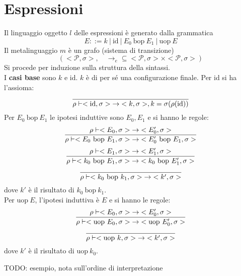 \documentclass[a4paper]{report}
\newcommand{\prop}{\mathcal{P}}
\newcommand{\bop}{\ \mathrm{bop}\ }
\newcommand{\uop}{\mathrm{uop}\ }
\theoremstyle{definition} \newtheorem*{defi}{Def}
\theoremstyle{plain} \newtheorem{lemma}{Lemma}
\theoremstyle{plain} \newtheorem{teo}{Teorema}
\theoremstyle{remark} \newtheorem*{es}{Esempio}
\DeclareRobustCommand{\frac}[3][0pt]{%
  {\begingroup\hspace{#1}#2\hspace{#1}\endgroup\over\hspace{#1}#3\hspace{#1}}}
\begin{document}
\section{Espressioni}
Il linguaggio oggetto $l$ delle espressioni è generato dalla grammatica
\[E \mathrel{::=} k\ | \mathrm{\ id\ } |\ E_0 \bop E_1\ |\ \uop E \]
Il metalinguaggio $m$ è un grafo (sistema di transizione)
\[(<\prop, \sigma>,\quad \mathbin{\rightarrow}_e \subseteq <\prop, \sigma> \times <\prop, \sigma>)\]
Si procede per induzione sulla struttura della sintassi.\\
I {\bf casi base} sono $k$ e id. $k$ è di per s\'e una configurazione finale.
Per id si ha l'assioma:
\begin{equation}
  \frac{}{\rho \vdash <\mathrm{id}, \sigma> \mathbin{\rightarrow} <k,\sigma>, k=\sigma(\rho(\mathrm{id}))}
\end{equation}
Per $E_0 \bop E_1$ le ipotesi induttive sono $E_0, E_1$ e si hanno le regole:
\begin{equation}
  \frac{
    \rho \vdash <E_0,\sigma> \mathbin{\rightarrow} <E_0',\sigma>
  }{
    \rho \vdash <E_0 \bop E_1,\sigma> \mathbin{\rightarrow} <E_0' \bop E_1,\sigma>
  }
\end{equation}
\begin{equation}
  \frac{
    \rho \vdash <E_1,\sigma> \mathbin{\rightarrow} <E_1',\sigma>
  }{
    \rho \vdash <k_0 \bop E_1,\sigma> \mathbin{\rightarrow} <k_0 \bop E_1',\sigma>
  }
\end{equation}
\begin{equation}
  \frac{}{
  \rho \vdash <k_0 \bop k_1,\sigma> \mathbin{\rightarrow} <k',\sigma>
  }
\end{equation}
dove $k'$ è il risultato di $k_0 \bop k_1$.\\
Per $\uop E$, l'ipotesi induttiva è $E$ e si hanno le regole:
\begin{equation}
  \frac{
    \rho \vdash <E_0,\sigma> \mathbin{\rightarrow} <E_0',\sigma>
  }{
    \rho \vdash <\uop E_0,\sigma> \mathbin{\rightarrow} <\uop E_0',\sigma>
  }
\end{equation}
\begin{equation}
  \frac{}{
  \rho \vdash <\uop k,\sigma> \mathbin{\rightarrow} <k',\sigma>
  }
\end{equation}
dove $k'$ è il risultato di $\uop k_0$.

TODO: esempio, nota sull'ordine di interpretazione
\end{document}
